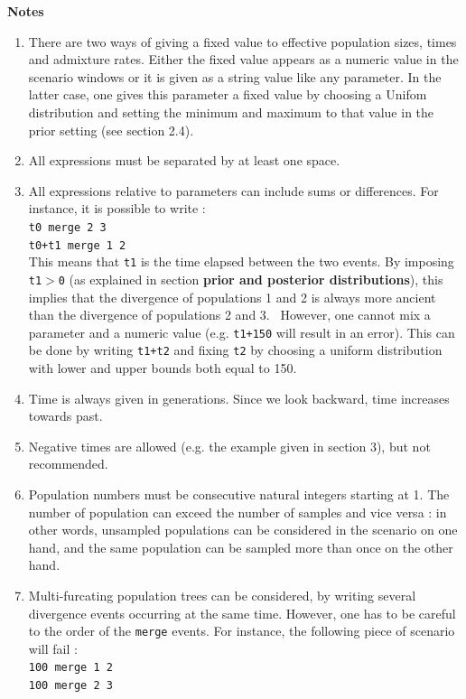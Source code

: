 \textbf{Notes}
\begin{enumerate}
\item There are two ways of giving a fixed value to effective population
sizes, times and admixture rates. Either the fixed value appears as
a numeric value in the scenario windows or it is given as a string
value like any parameter. In the latter case, one gives this parameter
a fixed value by choosing a Unifom distribution and setting the minimum
and maximum to that value in the prior setting (see section 2.4).
\item All expressions must be separated by at least one space.
\item All expressions relative to parameters can include sums or differences.
For instance, it is possible to write :\\
 \texttt{t0 merge 2 3}\\
 \texttt{t0+t1 merge 1 2}\\
 This means that \texttt{t1} is the time elapsed between the two events.
By imposing \texttt{t1$>$0} (as explained in section \textbf{prior and
posterior distributions}), this implies that the divergence of populations
1 and 2 is always more ancient than the divergence of populations
2 and 3. \
However, one cannot mix a parameter and a numeric value (e.g. \texttt{t1+150}
will result in an error). This can be done by writing \texttt{t1+t2}
and fixing \texttt{t2} by choosing a uniform distribution with lower
and upper bounds both equal to 150.
\item Time is always given in generations. Since we look backward, time
increases towards past.
\item Negative times are allowed (e.g. the example given in section 3),
but not recommended.
\item Population numbers must be consecutive natural integers starting at
1. The number of population can exceed the number of samples and vice
versa : in other words, unsampled populations can be considered in
the scenario on one hand, and the same population can be sampled more
than once on the other hand.
\item Multi-furcating population trees can be considered, by writing several
divergence events occurring at the same time. However, one has to
be careful to the order of the \texttt{merge} events. For instance,
the following piece of scenario will fail :\\
 \texttt{100 merge 1 2} \\
 \texttt{100 merge 2 3} \\

\end{enumerate}
